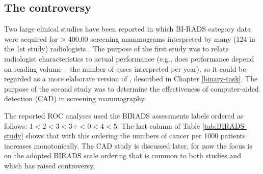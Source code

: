 \documentclass[
]{book}
\begin{document}
\hypertarget{binary-task-birads-rating-scale-controversy}{%
\subsection{The controversy}\label{binary-task-birads-rating-scale-controversy}}

Two large clinical studies have been reported in which BI-RADS category data were acquired for \textgreater{} 400,00 screening mammograms interpreted by many (124 in the 1st study) radiologists \citep{barlow2004accuracy, fenton2007influence}. The purpose of the first study was to relate radiologist characteristics to actual performance (e.g., does performance depend on reading volume -- the number of cases interpreted per year), so it could be regarded as a more elaborate version of \citep{beam1996variability}, described in Chapter \ref{binary-task}. The purpose of the second study was to determine the effectiveness of computer-aided detection (CAD) in screening mammography.

The reported ROC analyses used the BIRADS assessments labels ordered as follows: \(1 < 2 < 3 < 3+ < 0 < 4 < 5\). The last column of Table \ref{tab:BIRADS-study} shows that with this ordering the numbers of cancer per 1000 patients increases monotonically. The CAD study is discussed later, for now the focus is on the adopted BIRADS scale ordering that is common to both studies and which has raised controversy.

\begin{table}

\caption{\label{tab:BIRADS-study}The Barlow et al study: the ordering of the BI-RADS ratings in the first column correlates with cancer-rate in the last column.}
\centering
{}
\end{table}
\end{document}
